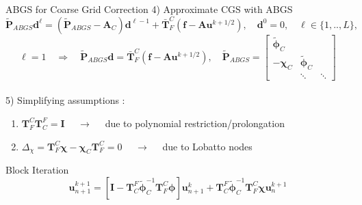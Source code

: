 \documentclass[11pt,aspectratio=43]{beamer}
\newcommand{\matr}[1]{\mathbf{#1}}
\newcommand{\vect}[1]{\boldsymbol{#1}}
\newcommand{\Imat}{\matr{I}}
\newcommand{\uvect}{\vect{u}}
\newcommand{\TFtoCBar}{\bar{\matr{T}}_F^C}
\newcommand{\TFtoC}{\matr{T}_F^C}
\newcommand{\TCtoF}{\matr{T}_C^F}
\newcommand{\AMat}{\matr{A}}
\newcommand{\phiOp}{\bm{\phi}}
\newcommand{\CoarseId}{C}
\newcommand{\ACoarse}{\matr{A}_\CoarseId}
\newcommand{\chiCoarse}{\bm{\chi}_\CoarseId}
\newcommand{\phiApproxCoarse}{\bm{\tilde{\phi}}_\CoarseId}
\begin{document}
\begin{frame}{ABGS for Coarse Grid Correction}
	4) Approximate CGS with ABGS
	$$
		\tilde{\matr{P}}_{ABGS} \vect{d}^{\ell} =
		(\tilde{\matr{P}}_{ABGS} - \ACoarse)\vect{d}^{\ell-1}
		+ \TFtoCBar (\vect{f}-\AMat\uvect^{k+1/2}),
		\quad \vect{d}^0 = 0,\quad \ell \in \{1,..,L\},
	$$\vspace{-10pt}
	$$
	\ell=1 \quad \Rightarrow \quad \tilde{\matr{P}}_{ABGS} \vect{d} = \TFtoCBar (\vect{f}-\AMat\uvect^{k+1/2}),
	\quad\tilde{\matr{P}}_{ABGS} =
	\begin{bmatrix}
		\phiApproxCoarse & & \\
		- \chiCoarse & \phiApproxCoarse & \\
		& \ddots & \ddots
	\end{bmatrix}
	$$\vspace{-15pt}\\
	5) Simplifying assumptions :
	\begin{enumerate}
		\item $\TFtoC\TCtoF = \Imat$ $\quad\rightarrow\quad$ due to polynomial restriction/prolongation
		\item $\Delta_\chi = \TFtoC\bm{\chi} - \bm{\chi}_C \TFtoC = 0$ $\quad\rightarrow\quad$ due to Lobatto nodes
	\end{enumerate}
	\begin{block}{Block Iteration}
		$$\vect{u}_{n+1}^{k+1} = \left[\matr{I} - \TCtoF\phiApproxCoarse^{-1}\TFtoC\phiOp\right] \vect{u}_{n+1}^{k} +
		\TCtoF\phiApproxCoarse^{-1}\TFtoC\bm{\chi}\vect{u}_{n}^{k+1}$$
	\end{block}\vspace{-20pt}
\end{frame}
\end{document}
